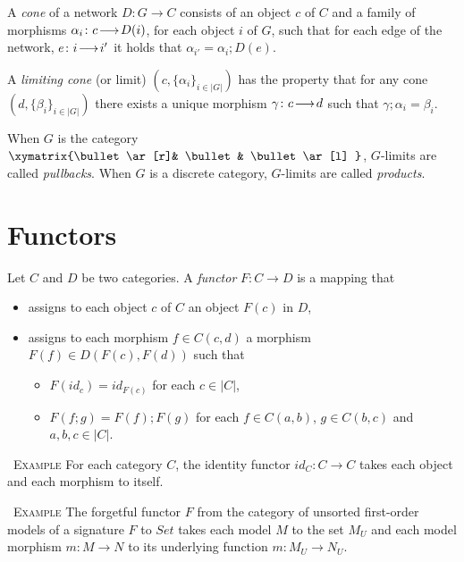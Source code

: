 \documentclass[10pt,fleqn,final]{scrreprt}
\newenvironment{example}[0]{\ \newline \textsc{Example}\quad }{}
\begin{document}
\begin{definition}
A \emph{cone} of
a network $D:G\to C$ consists of an object $c$ of $C$ and a family of
morphisms $\alpha_i\colon c\!\longrightarrow\!D(i)$, for each object $i$ of $G$, such that for
each edge of the network, $e\colon i\!\longrightarrow\!i'$  it holds that 
$\alpha_{i'} = \alpha_{i};D(e)$. 
\end{definition} 

\begin{definition}
A \emph{limiting cone} (or limit) $(c, \{\alpha_i\}_{i\in|G|})$ 
has the property that for any 
cone $(d, \{\beta_i\}_{i\in |G|})$ there exists a unique morphism 
$\gamma\colon c\!\longrightarrow\!d$ such that $\gamma;\alpha_i = \beta_i$.
 \end{definition}
 
 When $G$ is the category $\xymatrix{\bullet \ar[r]& \bullet & \bullet \ar[l] }$, $G$-limits are
called  \emph{pullbacks}.
 When $G$ is a discrete category,
 $G$-limits are called \emph{products}.

\section{Functors}

\begin{definition}
Let $C$ and $D$ be two categories. A \emph{functor} $F: C \to D $ is a mapping that 
\begin{itemize}
  \item assigns to each object $c$ of $C$ an object $F(c)$ in $D$,
  \item assigns to each morphism $f\in C(c,d)$ a morphism $F(f)\in D(F(c), F(d))$ such that 
   \begin{itemize}
     \item $F(id_c) = id_{F(c)} $ for each $c\in |C|$,
     \item $F(f;g) = F(f);F(g)$ for each $f\in C(a,b)$, $g\in C(b,c)$ and $a,b,c \in |C|$.
   \end{itemize}
\end{itemize}
\end{definition}

\begin{example}
 For each category $C$, the identity functor $id_C : C \to C$ takes 
 each object and each morphism to itself. 
\end{example}

\begin{example}
 The forgetful functor $F$ from the category of unsorted first-order models of a 
 signature $F$ to $Set$ takes each model $M$ to the set $M_U$ and each
 model morphism $m:M\to N$ to its underlying function $m:M_U \to N_U$.
\end{example}
\end{document}
